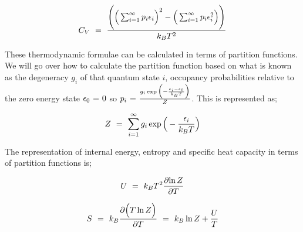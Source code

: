 \documentclass{article}
\begin{document}
\begin{equation} \label{eb-eq-256-59}
C_V \hspace{0.125cm} = \hspace{0.125cm} \frac{\Bigg(\Big( \sum_{i = 1}^{\infty} p_i \epsilon_i \Big)^2 - \Big( \sum_{i = 1}^{\infty} p_i \epsilon_{i}^{2}\Big) \Bigg)}{k_B T^2}
\end{equation}

These thermodynamic formulae can be calculated in terms of partition functions. We will go over how to calculate the partition function based on what is known as the degeneracy \begin{math} g_i \end{math} of that quantum state \begin{math} i \end{math}, occupancy probabilities relative to the zero energy state \begin{math} \epsilon_0 \hspace{0.025cm} = \hspace{0.025cm}  0 \end{math} so \begin{math} p_i \hspace{0.025cm} = \hspace{0.025cm} \frac{g_i \exp{\Big(-\frac{\epsilon_i - \epsilon_0}{k_B T} \Big)}}{Z} \end{math}. This is represented as;

\begin{equation} \label{eb-eq-256-60}
Z \hspace{0.125cm} = \hspace{0.125cm} \sum_{i = 1}^{\infty} g_i \exp{\Big(-\frac{\epsilon_i}{k_B T} \Big)}
\end{equation}

The representation of internal energy, entropy and specific heat capacity in terms of partition functions is;


\begin{equation} \label{eb-eq-256-61}
U \hspace{0.125cm} = \hspace{0.125cm} k_B T^2 \frac{\partial{\ln{Z}}}{\partial{T}}
\end{equation}

\begin{equation} \label{eb-eq-256-62}
S \hspace{0.125cm} = \hspace{0.125cm} k_B \frac{\partial{\Big( T \ln{Z}} \Big)}{\partial{T}} \hspace{0.125cm} = \hspace{0.125cm} k_B \ln{Z} + \frac{U}{T}
\end{equation}
\end{document}
